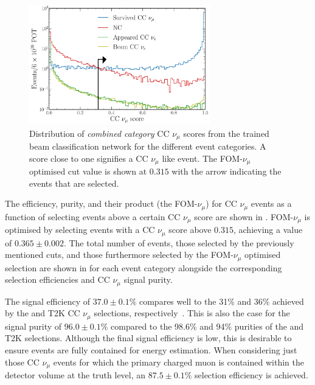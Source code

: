 \begin{figure} %
    \includegraphics[width=0.7\textwidth]{diagrams/7-results/final_beam_numu_outputs.pdf}
    \caption[Distribution of CC $\nu_{\mu}$ scores from the trained beam classification network]
    {Distribution of \emph{combined category} CC $\nu_{\mu}$ scores from the trained beam
        classification network for the different event categories. A score close to one signifies
        a CC $\nu_{\mu}$ like event. The FOM-$\nu_{\mu}$ optimised cut value is shown at $0.315$
        with the arrow indicating the events that are selected.}
    \label{fig:final_beam_numu_outputs}
\end{figure}

The efficiency, purity, and their product (the FOM-$\nu_{\mu}$) for CC $\nu_{\mu}$ events as a
function of selecting events above a certain CC $\nu_{\mu}$ score are shown in
. FOM-$\nu_{\mu}$ is optimised by selecting events with a CC
$\nu_{\mu}$ score above $0.315$, achieving a value of $0.365\pm0.002$. The total number of events,
those selected by the previously mentioned cuts, and those furthermore selected by the
FOM-$\nu_{\mu}$ optimised selection are shown in  for each event
category alongside the corresponding selection efficiencies and CC $\nu_{\mu}$ signal purity.

The signal efficiency of $37.0\pm0.1\%$ compares well to the 31\% and 36\% achieved by the \nova
and T2K CC $\nu_{\mu}$ selections, respectively~\cite{acero2019, abe2015}. This is also the case
for the signal purity of $96.0\pm0.1\%$ compared to the 98.6\% and 94\% purities of the \nova and
T2K selections. Although the final signal efficiency is low, this is desirable to ensure events
are fully contained for energy estimation. When considering just those CC $\nu_{\mu}$ events for
which the primary charged muon is contained within the detector volume at the truth level, an
$87.5\pm0.1\%$ selection efficiency is achieved.

